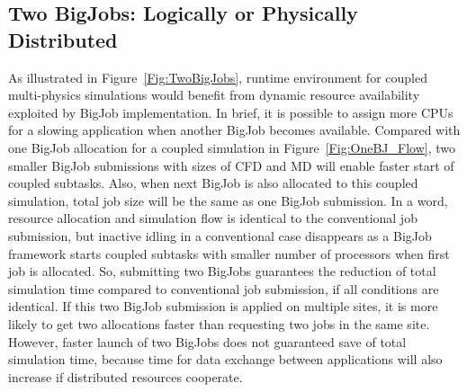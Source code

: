 \documentclass[conference,final]{IEEEtran}
\begin{document}
\subsection{Two BigJobs: Logically or Physically Distributed}

As illustrated in Figure~\ref{Fig:TwoBigJobs}, runtime environment for
coupled multi-physics simulations would benefit from dynamic resource
availability exploited by BigJob implementation. In brief, it is
possible to assign more CPUs for a slowing application when another
BigJob becomes available. Compared with one BigJob allocation for a
coupled simulation in Figure~\ref{Fig:OneBJ_Flow}, two smaller BigJob
submissions with sizes of CFD and MD will enable faster start of
coupled subtasks. Also, when next BigJob is also allocated to this
coupled simulation, total job size will be the same as one BigJob
submission. In a word, resource allocation and simulation flow is
identical to the conventional job submission, but inactive idling in a
conventional case disappears as a BigJob framework starts coupled
subtasks with smaller number of processors when first job is
allocated. So, submitting two BigJobs guarantees the reduction of
total simulation time compared to conventional job submission, if all
conditions are identical. If this two BigJob submission is applied on
multiple sites, it is more likely to get two allocations faster than
requesting two jobs in the same site. However, faster launch of two
BigJobs does not guaranteed save of total simulation time, because
time for data exchange between applications will also increase if
distributed resources cooperate.
\end{document}
